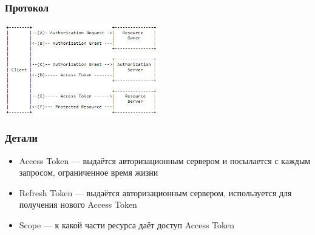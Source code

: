 \documentclass{../../slides-style}
\begin{document}
    \begin{frame}
        \frametitle{Протокол}
        \begin{center}
            \includegraphics[width=0.5\textwidth]{oauth.png}
        \end{center}
    \end{frame}

    \begin{frame}
        \frametitle{Детали}
        \begin{itemize}
            \item Access Token --- выдаётся авторизационным сервером и посылается с каждым запросом, ограниченное время жизни
            \item Refresh Token --- выдаётся авторизационным сервером, используется для получения нового Access Token
            \item Scope --- к какой части ресурса даёт доступ Access Token
        \end{itemize}
    \end{frame}
\end{document}
